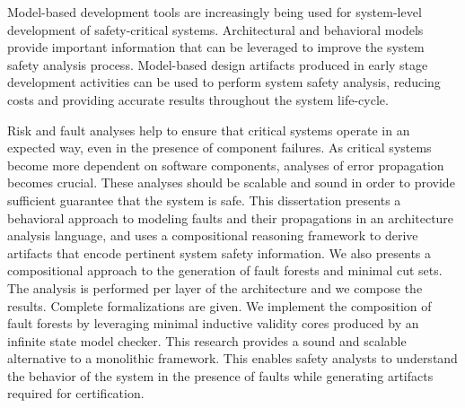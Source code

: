Model-based development tools are increasingly being used for system-level development of safety-critical systems. Architectural and behavioral models  provide important information that can be leveraged to improve the system safety analysis process. Model-based design artifacts produced in early stage development activities can be used to perform system safety analysis, reducing costs and providing accurate results throughout the system life-cycle.


Risk and fault analyses help to ensure that critical systems operate in an expected way, even in the presence of component failures. As critical systems become more dependent on software components, analyses of error propagation becomes crucial. These analyses should be scalable and sound in order to provide sufficient guarantee that the system is safe. This dissertation presents a behavioral approach to modeling faults and their propagations in an architecture analysis language, and uses a compositional reasoning framework to derive artifacts that encode pertinent system safety information. We also presents a compositional approach to the generation of fault forests and minimal cut sets.  The analysis is performed per layer of the architecture and we compose the results. Complete formalizations are given. We implement the composition of fault forests by leveraging minimal inductive validity cores produced by an infinite state model checker. This research provides a sound and scalable alternative to a monolithic framework. This enables safety analysts to understand the behavior of the system in the presence of faults while generating artifacts required for certification.





